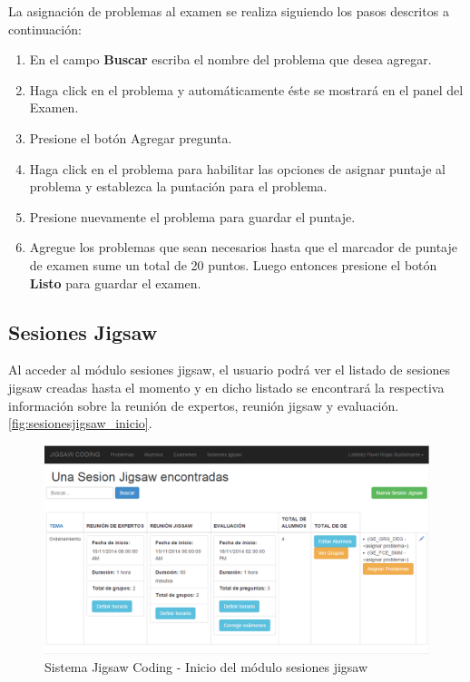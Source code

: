 La asignación de problemas al examen se realiza siguiendo los pasos descritos a continuación:

\begin{enumerate}
	\item En el campo \textbf{Buscar} escriba el nombre del problema que desea agregar.
	\item Haga click en el problema y automáticamente éste se mostrará en el panel del Examen.
	\item Presione el botón Agregar pregunta.
	\item Haga click en el problema para habilitar las opciones de asignar puntaje al problema y establezca la puntación para el problema. 
	\item Presione nuevamente el problema para guardar el puntaje.
	\item Agregue los problemas que sean necesarios hasta que el marcador de puntaje de examen sume un total de 20 puntos. Luego entonces presione el botón \textbf{Listo} para guardar el examen.
\end{enumerate}

\subsection{Sesiones Jigsaw}
Al acceder al módulo sesiones jigsaw, el usuario podrá ver el listado de sesiones jigsaw creadas hasta el momento y en dicho listado se encontrará la respectiva información sobre la reunión de expertos, reunión jigsaw y evaluación. \autoref{fig:sesionesjigsaw_inicio}.

\begin{figure}[h!]
\centering
\caption{Sistema Jigsaw Coding - Inicio del módulo sesiones jigsaw}
\label{fig:sesionesjigsaw_inicio}
\includegraphics[scale=0.5]{figuras/usodelsistema/docente/sesionesjigsaw_inicio}
\end{figure}
